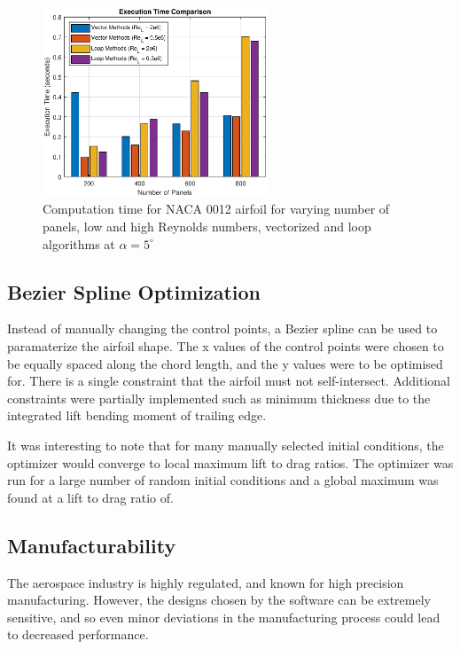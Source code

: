 \documentclass{article}
\begin{document}
\begin{figure}[H]
    \centering
    \includegraphics[width=0.6\textwidth]{figures/RePanelVec_times.eps}
    \caption{Computation time for NACA 0012 airfoil for varying number of panels, low and high Reynolds numbers, vectorized and loop algorithms at $\alpha = 5^\circ$}
    \label{fig:RePanelVec_times}
\end{figure}

\subsection{Bezier Spline Optimization}

Instead of manually changing the control points, a Bezier spline can be used to paramaterize the airfoil shape.
The x values of the control points were chosen to be equally spaced along the chord length, and the y values were to be optimised for.
There is a single constraint that the airfoil must not self-intersect.
Additional constraints were partially implemented such as minimum thickness due to the integrated lift bending moment of trailing edge.

It was interesting to note that for many manually selected initial conditions, the optimizer would converge to local maximum lift to drag ratios.
The optimizer was run for a large number of random initial conditions and a global maximum was found at a lift to drag ratio of.

\subsection{Manufacturability}

The aerospace industry is highly regulated, and known for high precision manufacturing.
However, the designs chosen by the software can be extremely sensitive, and so even minor deviations in the manufacturing process could lead to decreased performance.
\end{document}
